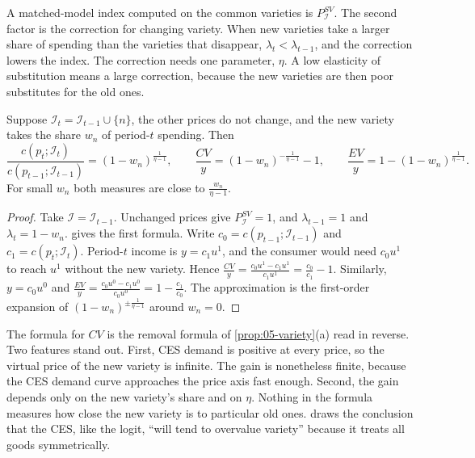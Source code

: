 A matched-model index computed on the common varieties is $P^{SV}_{\mathcal{I}}$. The second factor is the
correction for changing variety. When new varieties take a larger share of spending than the varieties that
disappear, $\lambda_t < \lambda_{t-1}$, and the correction lowers the index. The correction needs one
parameter, $\eta$. A low elasticity of substitution means a large correction, because the new varieties are
then poor substitutes for the old ones.

\begin{corollary}\label{cor:10-ces-newgood}
Suppose $\mathcal{I}_t = \mathcal{I}_{t-1}\cup\{n\}$, the other prices do not change, and the new variety
takes the share $w_n$ of period-$t$ spending. Then
\begin{equation}\label{eq:10-ces-newgood}
  \frac{c(p_t;\mathcal{I}_t)}{c(p_{t-1};\mathcal{I}_{t-1})} = (1 - w_n)^{\frac{1}{\eta-1}}, \qquad
  \frac{CV}{y} = (1 - w_n)^{-\frac{1}{\eta-1}} - 1, \qquad
  \frac{EV}{y} = 1 - (1 - w_n)^{\frac{1}{\eta-1}} .
\end{equation}
For small $w_n$ both measures are close to $\frac{w_n}{\eta - 1}$.
\end{corollary}

\begin{proof}
Take $\mathcal{I} = \mathcal{I}_{t-1}$. Unchanged prices give $P^{SV}_{\mathcal{I}} = 1$, and
$\lambda_{t-1} = 1$ and $\lambda_t = 1 - w_n$.  gives the first formula. Write
$c_0 = c(p_{t-1};\mathcal{I}_{t-1})$ and $c_1 = c(p_t;\mathcal{I}_t)$. Period-$t$ income is $y = c_1u^1$, and
the consumer would need $c_0u^1$ to reach $u^1$ without the new variety. Hence
$\frac{CV}{y} = \frac{c_0u^1 - c_1u^1}{c_1u^1} = \frac{c_0}{c_1} - 1$. Similarly, $y = c_0u^0$ and
$\frac{EV}{y} = \frac{c_0u^0 - c_1u^0}{c_0u^0} = 1 - \frac{c_1}{c_0}$. The approximation is the first-order
expansion of $(1 - w_n)^{\pm\frac{1}{\eta-1}}$ around $w_n = 0$.
\end{proof}

The formula for $CV$ is the removal formula of \cref{prop:05-variety}(a) read in reverse. Two features stand
out. First, CES demand is positive at every price, so the virtual price of the new variety is infinite. The
gain is nonetheless finite, because the CES demand curve approaches the price axis fast enough. Second, the
gain depends only on the new variety's share and on $\eta$. Nothing in the formula measures how close the new
variety is to particular old ones. \citet[p.~230]{Hausman1997} draws the conclusion that the CES, like the
logit, ``will tend to overvalue variety'' because it treats all goods symmetrically.

